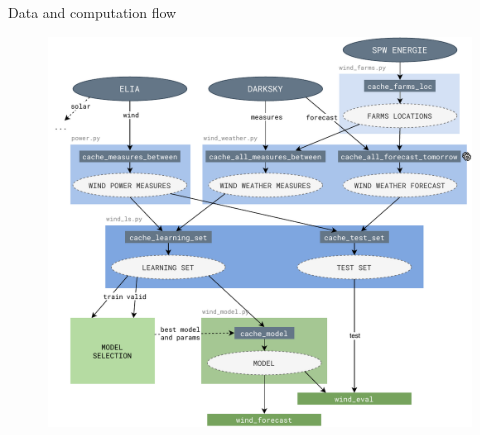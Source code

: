 \documentclass[12pt]{beamer}
\begin{document}
\begin{frame}{Data and computation flow}
	\begin{figure}
		\centering
		\includegraphics[width=.8\textwidth]{resources/pdf/diagram_wind.pdf}
	\end{figure}
\end{frame}
\end{document}
